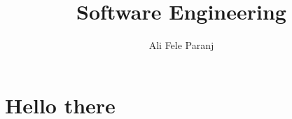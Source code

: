 \documentclass[10pt,a4paper]{report}
\author{Ali Fele Paranj}
\title{Software Engineering}
\begin{document}
 

\section{Hello there}


\end{document}
